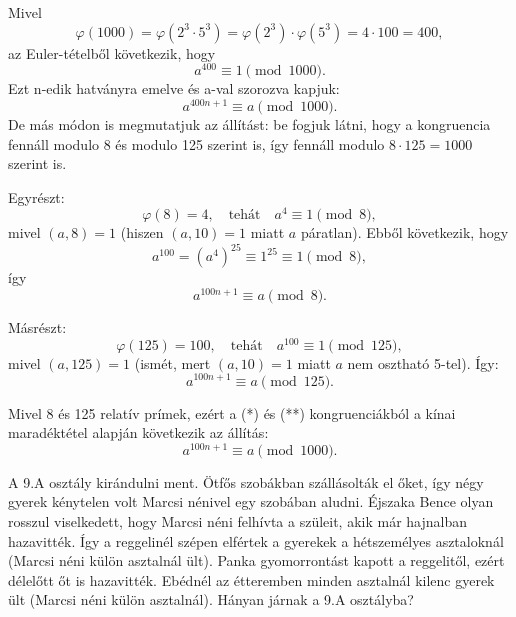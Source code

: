 \begin{solution}
	Mivel 
	\[
	\varphi(1000)=\varphi(2^{3}\cdot5^{3})=\varphi(2^{3})\cdot\varphi(5^{3})=4\cdot100=400,
	\]
	az Euler-tételből következik, hogy 
	\[
	a^{400}\equiv1\pmod{1000}.
	\]
	Ezt n-edik hatványra emelve és a-val szorozva kapjuk: 
	\[
	a^{400n+1}\equiv a\pmod{1000}.
	\]
	De más módon is megmutatjuk az állítást: be fogjuk látni, hogy a kongruencia
	fennáll modulo 8 és modulo 125 szerint is, így fennáll modulo $8\cdot125=1000$
	szerint is.
	
	Egyrészt: 
	\[
	\varphi(8)=4,\quad\text{tehát}\quad a^{4}\equiv1\pmod 8,
	\]
	mivel $(a,8)=1$ (hiszen $(a,10)=1$ miatt $a$ páratlan). Ebből következik,
	hogy 
	\[
	a^{100}=(a^{4})^{25}\equiv1^{25}\equiv1\pmod 8,
	\]
	így 
	\[
	a^{100n+1}\equiv a\pmod 8.\tag{*}
	\]
	
	Másrészt: 
	\[
	\varphi(125)=100,\quad\text{tehát}\quad a^{100}\equiv1\pmod{125},
	\]
	mivel $(a,125)=1$ (ismét, mert $(a,10)=1$ miatt $a$ nem osztható
	5-tel). Így: 
	\[
	a^{100n+1}\equiv a\pmod{125}.\tag{**}
	\]
	
	Mivel 8 és 125 relatív prímek, ezért a ({*}) és ({*}{*}) kongruenciákból
	a kínai maradéktétel alapján következik az állítás: 
	\[
	a^{100n+1}\equiv a\pmod{1000}.
	\]
\end{solution}
\begin{extraproblem}
	A 9.A osztály kirándulni ment. Ötfős szobákban szállásolták el őket,
	így négy gyerek kénytelen volt Marcsi nénivel egy szobában aludni.
	Éjszaka Bence olyan rosszul viselkedett, hogy Marcsi néni felhívta
	a szüleit, akik már hajnalban hazavitték. Így a reggelinél szépen
	elfértek a gyerekek a hétszemélyes asztaloknál (Marcsi néni külön
	asztalnál ült). Panka gyomorrontást kapott a reggelitől, ezért délelőtt
	őt is hazavitték. Ebédnél az étteremben minden asztalnál kilenc gyerek
	ült (Marcsi néni külön asztalnál). Hányan járnak a 9.A osztályba? 
\end{extraproblem}

